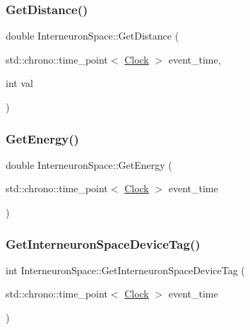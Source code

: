 \mbox{\label{classInterneuronSpace_a634322f8b405ead2dc51afb0a5c3d725}} 
\subsubsection{\texorpdfstring{Get\+Distance()}{GetDistance()}}
{\footnotesize\ttfamily double Interneuron\+Space\+::\+Get\+Distance (\begin{DoxyParamCaption}\item[{std\+::chrono\+::time\+\_\+point$<$ \mbox{\hyperlink{universe_8h_a0ef8d951d1ca5ab3cfaf7ab4c7a6fd80}{Clock}} $>$}]{event\+\_\+time,  }\item[{int}]{val }\end{DoxyParamCaption})}

\mbox{\label{classInterneuronSpace_a677430712211956219767d4fa71d20e6}} 
\subsubsection{\texorpdfstring{Get\+Energy()}{GetEnergy()}}
{\footnotesize\ttfamily double Interneuron\+Space\+::\+Get\+Energy (\begin{DoxyParamCaption}\item[{std\+::chrono\+::time\+\_\+point$<$ \mbox{\hyperlink{universe_8h_a0ef8d951d1ca5ab3cfaf7ab4c7a6fd80}{Clock}} $>$}]{event\+\_\+time }\end{DoxyParamCaption})\hspace{0.3cm}{\ttfamily [inline]}}

\mbox{\label{classInterneuronSpace_a66b6683bab6872dfece6111a8ccfb1d7}} 
\subsubsection{\texorpdfstring{Get\+Interneuron\+Space\+Device\+Tag()}{GetInterneuronSpaceDeviceTag()}}
{\footnotesize\ttfamily int Interneuron\+Space\+::\+Get\+Interneuron\+Space\+Device\+Tag (\begin{DoxyParamCaption}\item[{std\+::chrono\+::time\+\_\+point$<$ \mbox{\hyperlink{universe_8h_a0ef8d951d1ca5ab3cfaf7ab4c7a6fd80}{Clock}} $>$}]{event\+\_\+time }\end{DoxyParamCaption})\hspace{0.3cm}{\ttfamily [inline]}}

